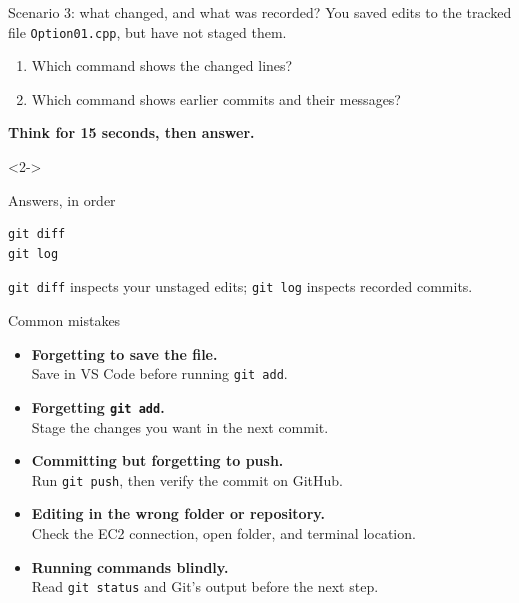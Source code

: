 \documentclass[10pt,aspectratio=169]{beamer}
\newcommand{\gitcmd}[1]{{\color{BootcampBlueDark}\texttt{#1}}}
\begin{document}
\begin{frame}[t,fragile]{Scenario 3: what changed, and what was recorded?}
  You saved edits to the tracked file \texttt{Option01.cpp}, but have not staged them.
  \medskip
  \begin{enumerate}
    \item Which command shows the changed lines?
    \item Which command shows earlier commits and their messages?
  \end{enumerate}
  \medskip
  {\small\textbf{Think for 15 seconds, then answer.}\par}
    \begin{uncoverenv}<2->
      \begin{exampleblock}{Answers, in order}
\begin{lstlisting}
git diff
git log
\end{lstlisting}
        \gitcmd{git diff} inspects your unstaged edits;
        \gitcmd{git log} inspects recorded commits.
      \end{exampleblock}
    \end{uncoverenv}
\end{frame}

\begin{frame}{Common mistakes}
  \begin{itemize}
    \setlength{\itemsep}{1.0em}
    \item \textbf{Forgetting to save the file.}\\
      Save in VS Code before running \gitcmd{git add}.
    \item \textbf{Forgetting \gitcmd{git add}.}\\
      Stage the changes you want in the next commit.
    \item \textbf{Committing but forgetting to push.}\\
      Run \gitcmd{git push}, then verify the commit on GitHub.
    \item \textbf{Editing in the wrong folder or repository.}\\
      Check the EC2 connection, open folder, and terminal location.
    \item \textbf{Running commands blindly.}\\
      Read \gitcmd{git status} and Git's output before the next step.
  \end{itemize}
\end{frame}
\end{document}
